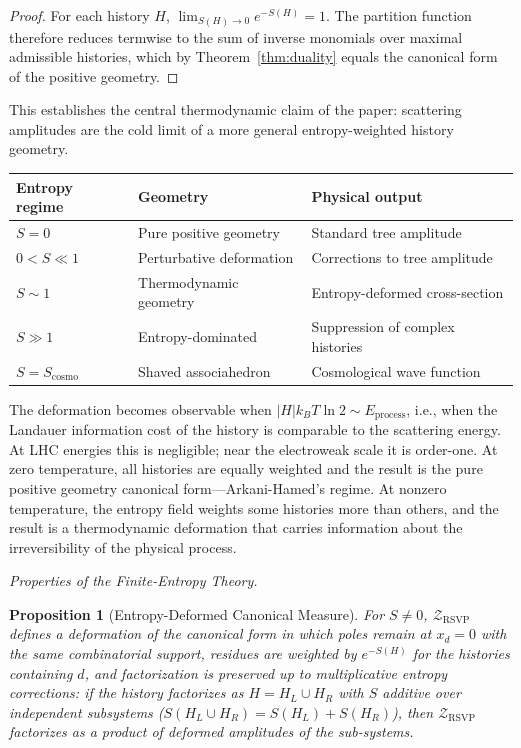 \documentclass[11pt]{article}
\theoremstyle{plain}
\newtheorem{proposition}[theorem]{Proposition}
\theoremstyle{definition}
\theoremstyle{remark}
\newcommand{\Sf}{S}
\newcommand{\ZRSVP}{\mathcal{Z}_{\mathrm{RSVP}}}
\begin{document}
\begin{proof}
For each history $H$, $\lim_{\Sf(H) \to 0} e^{-\Sf(H)} = 1$. The partition function therefore reduces termwise to the sum of inverse monomials over maximal admissible histories, which by Theorem~\ref{thm:duality} equals the canonical form of the positive geometry.
\end{proof}

This establishes the central thermodynamic claim of the paper: scattering amplitudes are the cold limit of a more general entropy-weighted history geometry.

\begin{center}
\begin{tabular}{lll}
\toprule
Entropy regime & Geometry & Physical output \\
\midrule
$\Sf = 0$ & Pure positive geometry & Standard tree amplitude \\
$0 < \Sf \ll 1$ & Perturbative deformation & Corrections to tree amplitude \\
$\Sf \sim 1$ & Thermodynamic geometry & Entropy-deformed cross-section \\
$\Sf \gg 1$ & Entropy-dominated & Suppression of complex histories \\
$\Sf = \Sf_{\mathrm{cosmo}}$ & Shaved associahedron & Cosmological wave function \\
\bottomrule
\end{tabular}
\end{center}

The deformation becomes observable when $|H| k_B T \ln 2 \sim E_{\mathrm{process}}$, i.e., when the Landauer information cost of the history is comparable to the scattering energy. At LHC energies this is negligible; near the electroweak scale it is order-one. At zero temperature, all histories are equally weighted and the result is the pure positive geometry canonical form---Arkani-Hamed's regime. At nonzero temperature, the entropy field weights some histories more than others, and the result is a thermodynamic deformation that carries information about the irreversibility of the physical process.

\medskip\noindent\textit{Properties of the Finite-Entropy Theory.}

\begin{proposition}[Entropy-Deformed Canonical Measure]
For $\Sf \neq 0$, $\ZRSVP$ defines a deformation of the canonical form in which poles remain at $x_d = 0$ with the same combinatorial support, residues are weighted by $e^{-\Sf(H)}$ for the histories containing $d$, and factorization is preserved up to multiplicative entropy corrections: if the history factorizes as $H = H_L \cup H_R$ with $\Sf$ additive over independent subsystems ($\Sf(H_L \cup H_R) = \Sf(H_L) + \Sf(H_R)$), then $\ZRSVP$ factorizes as a product of deformed amplitudes of the sub-systems.
\end{proposition}
\end{document}
